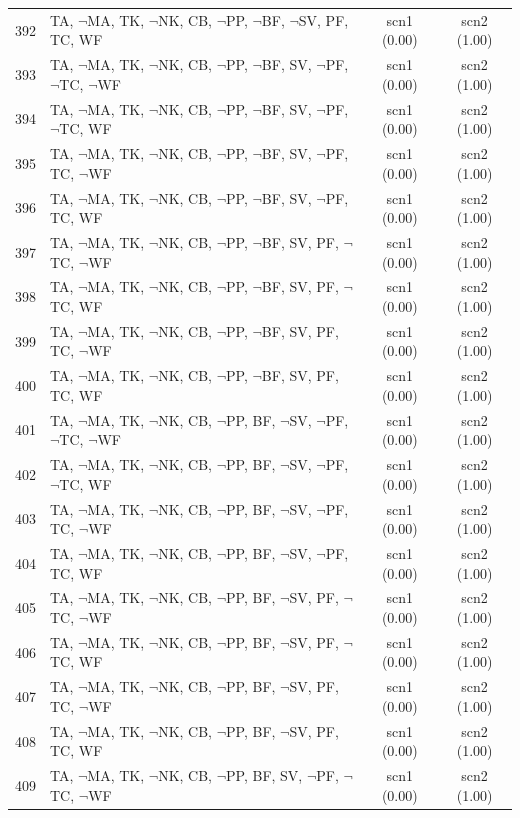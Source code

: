 \documentclass[12pt]{article}
\begin{document}
\begin{longtable}{|l|l|c|c|}
392 & TA, $\neg$MA, TK, $\neg$NK, CB, $\neg$PP, $\neg$BF, $\neg$SV, PF, TC, WF & scn1 (0.00) & scn2 (1.00)\\
393 & TA, $\neg$MA, TK, $\neg$NK, CB, $\neg$PP, $\neg$BF, SV, $\neg$PF, $\neg$TC, $\neg$WF & scn1 (0.00) & scn2 (1.00)\\
394 & TA, $\neg$MA, TK, $\neg$NK, CB, $\neg$PP, $\neg$BF, SV, $\neg$PF, $\neg$TC, WF & scn1 (0.00) & scn2 (1.00)\\
395 & TA, $\neg$MA, TK, $\neg$NK, CB, $\neg$PP, $\neg$BF, SV, $\neg$PF, TC, $\neg$WF & scn1 (0.00) & scn2 (1.00)\\
396 & TA, $\neg$MA, TK, $\neg$NK, CB, $\neg$PP, $\neg$BF, SV, $\neg$PF, TC, WF & scn1 (0.00) & scn2 (1.00)\\
397 & TA, $\neg$MA, TK, $\neg$NK, CB, $\neg$PP, $\neg$BF, SV, PF, $\neg$TC, $\neg$WF & scn1 (0.00) & scn2 (1.00)\\
398 & TA, $\neg$MA, TK, $\neg$NK, CB, $\neg$PP, $\neg$BF, SV, PF, $\neg$TC, WF & scn1 (0.00) & scn2 (1.00)\\
399 & TA, $\neg$MA, TK, $\neg$NK, CB, $\neg$PP, $\neg$BF, SV, PF, TC, $\neg$WF & scn1 (0.00) & scn2 (1.00)\\
400 & TA, $\neg$MA, TK, $\neg$NK, CB, $\neg$PP, $\neg$BF, SV, PF, TC, WF & scn1 (0.00) & scn2 (1.00)\\
401 & TA, $\neg$MA, TK, $\neg$NK, CB, $\neg$PP, BF, $\neg$SV, $\neg$PF, $\neg$TC, $\neg$WF & scn1 (0.00) & scn2 (1.00)\\
402 & TA, $\neg$MA, TK, $\neg$NK, CB, $\neg$PP, BF, $\neg$SV, $\neg$PF, $\neg$TC, WF & scn1 (0.00) & scn2 (1.00)\\
403 & TA, $\neg$MA, TK, $\neg$NK, CB, $\neg$PP, BF, $\neg$SV, $\neg$PF, TC, $\neg$WF & scn1 (0.00) & scn2 (1.00)\\
404 & TA, $\neg$MA, TK, $\neg$NK, CB, $\neg$PP, BF, $\neg$SV, $\neg$PF, TC, WF & scn1 (0.00) & scn2 (1.00)\\
405 & TA, $\neg$MA, TK, $\neg$NK, CB, $\neg$PP, BF, $\neg$SV, PF, $\neg$TC, $\neg$WF & scn1 (0.00) & scn2 (1.00)\\
406 & TA, $\neg$MA, TK, $\neg$NK, CB, $\neg$PP, BF, $\neg$SV, PF, $\neg$TC, WF & scn1 (0.00) & scn2 (1.00)\\
407 & TA, $\neg$MA, TK, $\neg$NK, CB, $\neg$PP, BF, $\neg$SV, PF, TC, $\neg$WF & scn1 (0.00) & scn2 (1.00)\\
408 & TA, $\neg$MA, TK, $\neg$NK, CB, $\neg$PP, BF, $\neg$SV, PF, TC, WF & scn1 (0.00) & scn2 (1.00)\\
409 & TA, $\neg$MA, TK, $\neg$NK, CB, $\neg$PP, BF, SV, $\neg$PF, $\neg$TC, $\neg$WF & scn1 (0.00) & scn2 (1.00)\\

\end{longtable}
\end{document}
